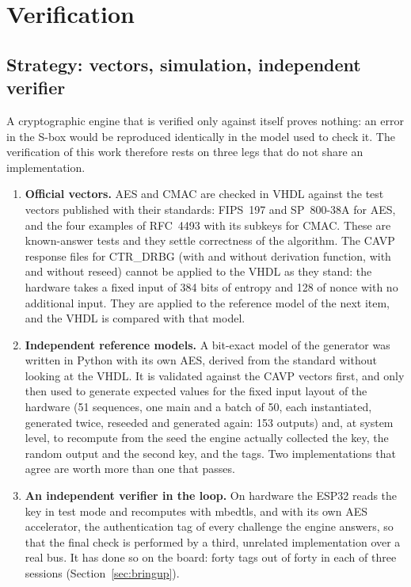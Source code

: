 \chapter{Verification}
\label{ch:ch5_verification}


\section{Strategy: vectors, simulation, independent verifier}
\label{sec:verif_strategy}

A cryptographic engine that is verified only against itself proves
nothing: an error in the S-box would be reproduced identically in the
model used to check it. The verification of this work therefore rests on
three legs that do not share an implementation.

\begin{enumerate}
\item \textbf{Official vectors.} AES and CMAC are checked in VHDL against
the test vectors published with their standards: FIPS~197 and SP~800-38A
for AES, and the four examples of RFC~4493 with its subkeys for CMAC.
These are
known-answer tests and they settle correctness of the algorithm. The
CAVP response files for CTR\_DRBG (with and without derivation function,
with and without reseed) cannot be applied to the VHDL as they stand:
the hardware takes a fixed input of 384 bits of entropy and 128 of nonce
with no additional input. They are applied to the reference model of the
next item, and the VHDL is compared with that model.
\item \textbf{Independent reference models.} A bit-exact model of the
generator was written in Python with its own AES, derived from the
standard without looking at the VHDL. It is validated against the CAVP
vectors first, and only then used to generate expected values for the
fixed input layout of the hardware (51 sequences, one main and a batch
of 50, each instantiated, generated twice, reseeded and generated again:
153 outputs) and, at system level, to
recompute from the seed the engine actually collected the key, the
random output and the second key, and the tags. Two implementations that
agree are worth more than one that passes.
\item \textbf{An independent verifier in the loop.} On hardware the
ESP32 reads the key in test mode and recomputes with mbedtls, and with
its own AES accelerator, the authentication tag of every challenge the
engine answers, so that the final check is performed by a third,
unrelated implementation over a real bus. It has done so on the board:
forty tags out of forty in each of three sessions \meas{}
(Section~\ref{sec:bringup}).
\end{enumerate}

